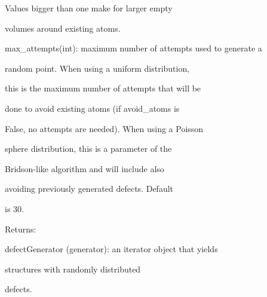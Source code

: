\documentclass[letterpaper,10pt,english]{sphinxmanual}
\begin{document}
\begin{fulllineitems}
\begin{DUlineblock}{0em}
\begin{DUlineblock}{\DUlineblockindent}
\begin{DUlineblock}{\DUlineblockindent}
\item[] Values bigger than one make for larger empty
\item[] volumes around existing atoms.
\end{DUlineblock}
\item[] max\_attempts(int): maximum number of attempts used to generate a
\item[]
\begin{DUlineblock}{\DUlineblockindent}
\item[] random point. When using a uniform distribution,
\item[] this is the maximum number of attempts that will be
\item[] done to avoid existing atoms (if avoid\_atoms is
\item[] False, no attempts are needed). When using a Poisson
\item[] sphere distribution, this is a parameter of the
\item[] Bridson-like algorithm and will include also
\item[] avoiding previously generated defects. Default
\item[] is 30.
\end{DUlineblock}
\end{DUlineblock}
\end{DUlineblock}

\begin{DUlineblock}{0em}
\item[] Returns:
\item[]
\begin{DUlineblock}{\DUlineblockindent}
\item[] defectGenerator (generator): an iterator object that yields
\item[]
\begin{DUlineblock}{\DUlineblockindent}
\item[] structures with randomly distributed
\item[] defects.
\end{DUlineblock}
\end{DUlineblock}
\end{DUlineblock}

\end{fulllineitems}

\end{document}
